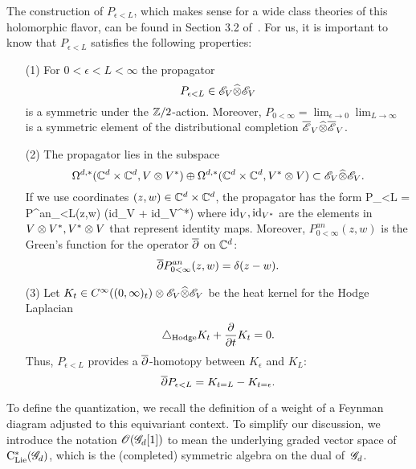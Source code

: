 The construction of $P_{\epsilon<L}$, which makes sense for a wide class theories of this holomorphic flavor, can be found in Section 3.2 of~\cite{BWhol}.
For us, it is important to know that $P_{\epsilon<L}$ satisfies the following properties:

\begin{enumerate}
\item[(1)] For $0 < \epsilon < L < \infty$ the propagator 
\[
P_{\epsilon < L} \in \mathscr E_V \widehat{\otimes} \mathscr E_V 
\]
is a symmetric under the $\mathbb Z/2$-action.
Moreover, $P_{0 < \infty} = \lim_{\epsilon \to 0}\lim_{L \to \infty}$ is a symmetric element of the distributional completion $\overline{\mathscr E}_V \widehat{\otimes} \overline{\mathscr E}_V$. 

\item[(2)] 
The propagator lies in the subspace
\[
\Omega^{d,*}(\mathbb C^d \times \mathbb C^d, V \otimes V^*) \oplus \Omega^{d,*}(\mathbb C^d \times \mathbb C^d, V^* \otimes V) \subset \mathscr E_V \widehat{\otimes} \mathscr E_V .
\]
If we use coordinates $(z,w) \in \mathbb C^d \times \mathbb C^d$, the propagator has the form
\beqn
P_{\epsilon<L} = P^{an}_{\epsilon<L}(z,w) \tensor \left({\rm id}_{V} + {\rm id}_{V^*}\right)
\eeqn
where ${\rm id}_V, {\rm id}_{V^*}$ are the elements in $V \otimes V^*, V^* \otimes V$ that represent identity maps. 
Moreover, $P^{an}_{0 < \infty} (z,w)$ is the Green's function for the operator $\overline{\partial}$ on $\mathbb C^d$:
\[
\overline{\partial} P^{an}_{0<\infty} (z,w) = \delta (z-w) .
\]

\item[(3)] Let $K_t \in C^\infty((0,\infty)_t) \otimes \mathscr E_V \widehat{\otimes} \mathscr E_V$ be the heat kernel for the Hodge Laplacian
\[
\triangle_{\rm Hodge} K_t + \frac{\partial}{\partial t} K_t = 0 .
\]
Thus, $P_{\epsilon < L}$ provides a $\overline{\partial}$-homotopy between $K_\epsilon$ and $K_L$:
\[
\overline{\partial} P_{\epsilon < L} = K_{t=L} - K_{t=\epsilon} .
\]
\end{enumerate}


To define the quantization, we recall the definition of a weight of a Feynman diagram adjusted to this equivariant context.
To simplify our discussion, we introduce the notation $\mathscr O(\mathscr G_d[1])$ to mean the underlying graded vector space of ${\rm C}_{{\rm Lie}}^*(\mathscr G_d)$, which is the (completed) symmetric algebra on the dual of~$\mathscr G_d$. 

